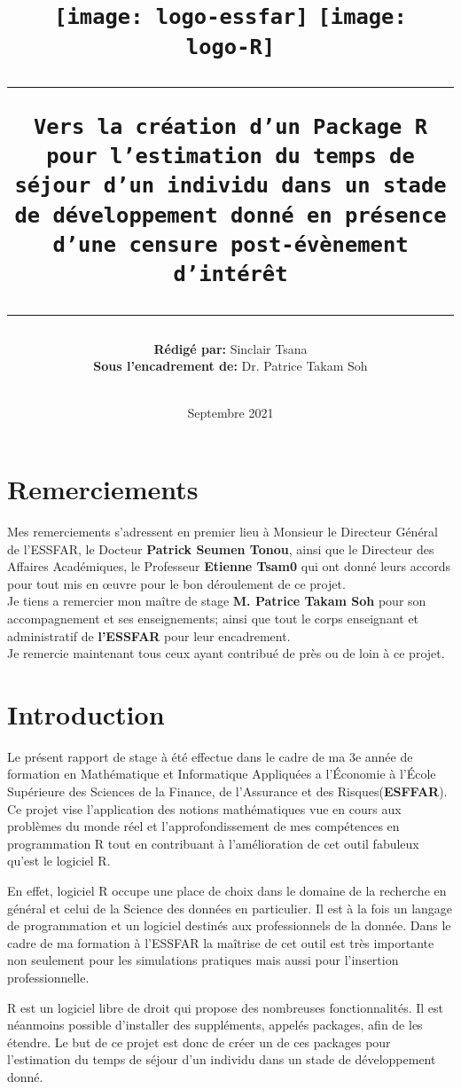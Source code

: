 \documentclass[12pt,a4paper]{scrbook}
\title{
	\begin{figure}
			\texttt{[image: logo-essfar]}
			\hspace{185pt}
			\texttt{[image: logo-R]}
	\end{figure}
	\centering
	\text{\Huge Rapport de stage}
\rule{\textwidth}{2pt} 
\texttt{\Large Vers la création d'un Package R pour l'estimation du temps de séjour d'un individu dans un stade de développement donné en présence d'une censure post-évènement d'intérêt}
\rule{\textwidth}{2pt}}
\author{\textbf{Rédigé par:} Sinclair Tsana\\
		\textbf{Sous l'encadrement de:} Dr. Patrice Takam Soh\\
		\\
		\text{Stage de 3e Année}}
\date{Septembre 2021}
\begin{document}
	
	\maketitle
	\tableofcontents
	\chapter*{Remerciements}
	Mes remerciements s'adressent en premier lieu à Monsieur le Directeur Général de l'ESSFAR, le Docteur \textbf{Patrick Seumen Tonou}, ainsi que le Directeur des Affaires Académiques, le Professeur \textbf{Etienne Tsam0} qui ont donné leurs accords pour tout mis en œuvre pour le bon déroulement de ce projet.\\
	
	Je tiens a remercier mon maître de stage \textbf{M. Patrice Takam Soh} pour son accompagnement et ses enseignements; ainsi que tout le corps enseignant et administratif de \textbf{l'ESSFAR} pour leur encadrement.\\
	
	Je remercie maintenant tous ceux ayant contribué de près ou de loin à ce projet.
		
	\chapter{Introduction}
	\par Le présent rapport de stage à été effectue dans le cadre de ma 3e année de formation en Mathématique et Informatique Appliquées a l'Économie à l'École Supérieure des Sciences de la Finance, de l'Assurance et des Risques(\textbf{ESFFAR}).
	Ce projet vise l'application des notions mathématiques vue en cours aux problèmes du monde réel et l'approfondissement de mes compétences en programmation R tout en contribuant à l'amélioration de cet outil fabuleux qu'est le logiciel R.
	\par En effet, logiciel R occupe une place de choix dans le domaine de la recherche en général et celui de la Science des données en particulier. Il est à la fois un langage de programmation et un logiciel destinés aux professionnels de la donnée. Dans le cadre de ma formation à l'ESSFAR la maîtrise de cet outil est très importante non seulement pour les simulations pratiques mais aussi pour l'insertion professionnelle.
	\par R est un logiciel libre de droit qui propose des nombreuses fonctionnalités. Il est néanmoins possible d'installer des suppléments, appelés packages, afin de les étendre. Le but de ce projet est donc de créer un de ces packages pour l’estimation du temps de séjour d’un individu dans un stade de développement donné.
\end{document}
